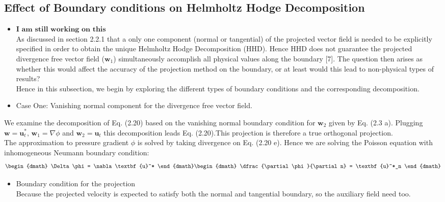 \subsection{Effect of Boundary conditions on Helmholtz Hodge Decomposition}
\begin{itemize}
\item
$\textbf{I am still working on this}$\\
As discussed in section 2.2.1 that a only one component (normal or tangential) of the projected vector field is needed to be explicitly specified in order to obtain the unique Helmholtz Hodge Decomposition (HHD). Hence HHD does not guarantee the projected divergence free vector field ($\textbf{w}_1$) simultaneously accomplish all physical values along the boundary [7]. The question then arises as whether this would affect the accuracy of the projection method on the boundary, or at least would this lead to non-physical types of results?\\
Hence in this subsection, we begin by exploring the different types of boundary conditions and the corresponding decomposition.
\end{itemize}

\begin{itemize}
\item
Case One: Vanishing normal component for the divergence free vector field.
\end{itemize}
We examine the decomposition of Eq. (2.20) based on the vanishing normal boundary condition for $\textbf{w}_2$ given by Eq. (2.3 a). Plugging $\textbf{w} = \textbf{u}^*_t, \, \textbf{w}_1 = \nabla \phi$ and $\textbf{w}_2 = \textbf{u}_t$ this decomposition leads Eq. (2.20).This projection is therefore a true orthogonal  projection. \\
The approximation to pressure gradient $\phi$ is solved by taking divergence on Eq. (2.20 e). Hence we are solving the Poisson equation with inhomogeneous Neumann boundary condition:
\begin{dgroup}
\begin{dmath}
\Delta \phi = \nabla \textbf{u}^*
\end{dmath}
\begin{dmath}
\dfrac{\partial \phi}{\partial n} = \textbf{u}^*_n
\end{dmath}
\end{dgroup}

\begin{itemize}
\item Boundary condition for the projection\\
Because the projected velocity is expected to satisfy both the normal and tangential boundary, so the auxiliary field need too.
\end{itemize}

